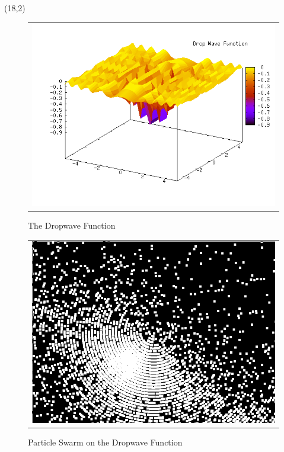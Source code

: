 \documentclass[portrait, a0]{a0poster}
\begin{document}
\begin{textblock}{8}(18,2)
\begin{figure}
\centering
\begin{tabular}{c}
\\
\includegraphics[scale=1.0]{pics/DropWave.png}
\end{tabular}
\color{white}
\caption{The Dropwave Function \label{fig:DropWaveFunction}}
\end{figure}

\begin{figure}
\centering
\begin{tabular}{c}
\\
\includegraphics[scale=1.0]{pics/dropwave.png}
\end{tabular}
\color{white}
\caption{Particle Swarm on the Dropwave Function \label{fig:logicalmappings}}
\end{figure}


\end{textblock}
\end{document}
